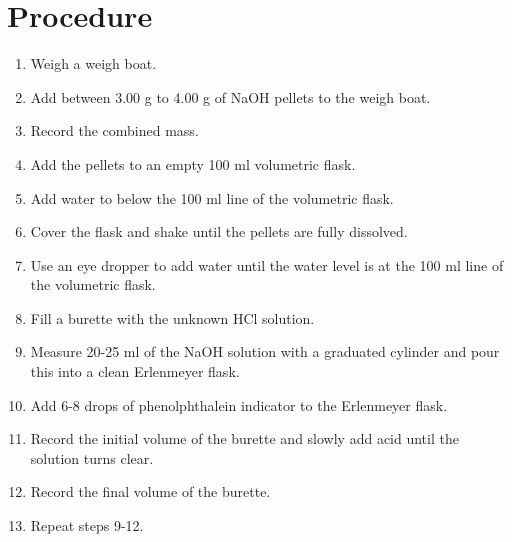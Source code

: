 \documentclass[12pt]{article}
\begin{document}
    \section*{Procedure}
        \begin{enumerate}
            \item Weigh a weigh boat.
            \item Add between 3.00 g to 4.00 g of NaOH pellets to the weigh boat.
            \item Record the combined mass.
            \item Add the pellets to an empty 100 ml volumetric flask. 
            \item Add water to below the 100 ml line of the volumetric flask.
            \item Cover the flask and shake until the pellets are fully dissolved.
            \item Use an eye dropper to add water until the water level is at the 100 ml line of the volumetric flask.
            \item Fill a burette with the unknown HCl solution.
            \item Measure 20-25 ml of the NaOH solution with a graduated cylinder and pour this into a clean Erlenmeyer flask.
            \item Add 6-8 drops of phenolphthalein indicator to the Erlenmeyer flask.
            \item Record the initial volume of the burette and slowly add acid until the solution turns clear.
            \item Record the final volume of the burette.
            \item Repeat steps 9-12.
        \end{enumerate}
\end{document}
